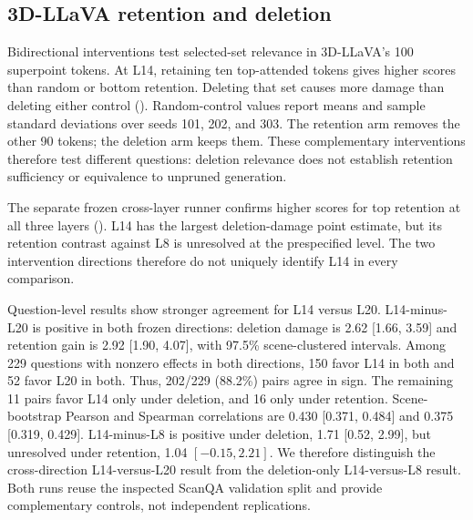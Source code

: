 \subsection{3D-LLaVA retention and deletion}
Bidirectional interventions test selected-set relevance in 3D-LLaVA's 100 superpoint tokens. At L14, retaining ten top-attended tokens gives higher scores than random or bottom retention. Deleting that set causes more damage than deleting either control (). Random-control values report means and sample standard deviations over seeds 101, 202, and 303. The retention arm removes the other 90 tokens; the deletion arm keeps them. These complementary interventions therefore test different questions: deletion relevance does not establish retention sufficiency or equivalence to unpruned generation.

\begin{table}[t]
\centering
\caption{Bidirectional L14 intervention on 3D-LLaVA ScanQA.}
\label{tab:supp_bidir}
\end{table}

The separate frozen cross-layer runner confirms higher scores for top retention at all three layers (). L14 has the largest deletion-damage point estimate, but its retention contrast against L8 is unresolved at the prespecified level. The two intervention directions therefore do not uniquely identify L14 in every comparison.

Question-level results show stronger agreement for L14 versus L20. L14-minus-L20 is positive in both frozen directions: deletion damage is 2.62 [1.66, 3.59] and retention gain is 2.92 [1.90, 4.07], with 97.5\% scene-clustered intervals. Among 229 questions with nonzero effects in both directions, 150 favor L14 in both and 52 favor L20 in both. Thus, 202/229 (88.2\%) pairs agree in sign. The remaining 11 pairs favor L14 only under deletion, and 16 only under retention. Scene-bootstrap Pearson and Spearman correlations are 0.430 [0.371, 0.484] and 0.375 [0.319, 0.429]. L14-minus-L8 is positive under deletion, 1.71 [0.52, 2.99], but unresolved under retention, 1.04 $[-0.15, 2.21]$. We therefore distinguish the cross-direction L14-versus-L20 result from the deletion-only L14-versus-L8 result. Both runs reuse the inspected ScanQA validation split and provide complementary controls, not independent replications.



